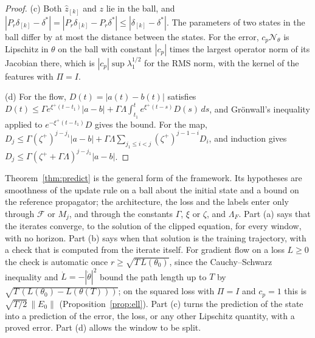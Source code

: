 \documentclass[11pt]{article}
\theoremstyle{definition}
\theoremstyle{remark}
\newcommand{\Net}{\mathcal{N}_\theta}    %
\begin{document}
\begin{proof}
(c) Both $\hat z_{[k]}$ and $z$ lie in the ball, and $|P_r\delta_{[k]} - \delta^\ast| = |P_r\delta_{[k]} - P_r\delta^\ast|\le|\delta_{[k]} - \delta^\ast|$.
The parameters of two states in the ball differ by at most the distance between the states.
For the error, $c_p\Net$ is Lipschitz in $\theta$ on the ball with constant $|c_p|$ times the largest operator norm of its Jacobian there, which is $|c_p|\sup\lambda_1^{1/2}$ for the RMS norm, with the kernel of the features with $\Pi = I$.

(d) For the flow, $D(t) = |a(t) - b(t)|$ satisfies $D(t)\le\Gamma e^{\xi^+(t-t_1)}|a - b| + \Gamma\Lambda\int_{t_1}^te^{\xi^+(t-s)}D(s)\,ds$, and Gr\"onwall's inequality applied to $e^{-\xi^+(t-t_1)}D$ gives the bound.
For the map, $D_j\le\Gamma(\zeta^+)^{j-j_1}|a - b| + \Gamma\Lambda\sum_{j_1\le i<j}(\zeta^+)^{j-1-i}D_i$, and induction gives $D_j\le\Gamma(\zeta^+ + \Gamma\Lambda)^{j-j_1}|a - b|$.
\end{proof}

Theorem~\ref{thm:predict} is the general form of the framework.
Its hypotheses are smoothness of the update rule on a ball about the initial state and a bound on the reference propagator; the architecture, the loss and the labels enter only through $\mathcal{F}$ or $M_j$, and through the constants $\Gamma$, $\xi$ or $\zeta$, and $\Lambda_F$.
Part (a) says that the iterates converge, to the solution of the clipped equation, for every window, with no horizon.
Part (b) says when that solution is the training trajectory, with a check that is computed from the iterate itself.
For gradient flow on a loss $L\ge0$ the check is automatic once $r\ge\sqrt{T\,L(\theta_0)}$, since the Cauchy--Schwarz inequality and $\dot L = -|\dot\theta|^2$ bound the path length up to $T$ by $\sqrt{T\,(L(\theta_0) - L(\theta(T)))}$; on the squared loss with $\Pi = I$ and $c_p = 1$ this is $\sqrt{T/2}\,\|E_0\|$ (Proposition~\ref{prop:ell}).
Part (c) turns the prediction of the state into a prediction of the error, the loss, or any other Lipschitz quantity, with a proved error.
Part (d) allows the window to be split.
\end{document}
